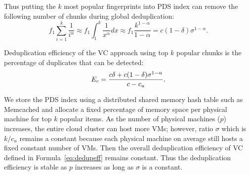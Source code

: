 Thus putting the $k$ most popular fingerprints into PDS index can remove the following number of chunks during global 
deduplication:
\[
f_1 \sum_{i=1}^{k}\frac{1}{i^\alpha} \approx  
f_1 \int_{1}^{k}\frac{1}{x^\alpha} dx  \approx  f_1\frac{  k^{1-\alpha}} {1-\alpha}
=c(1-\delta) \sigma^{1-\alpha}.
\]

Deduplication efficiency of the VC approach using top $k$ popular chunks
is the percentage of duplicates that can be detected:  
\begin{equation}
\label{eq:dedupeff}
E_c=\frac{ c\delta + c(1-\delta) \sigma^{1-\alpha}}
{c  - c_u }.\\
\end{equation}


We store the PDS index using a distributed shared memory hash table such as Memcached
and allocate a fixed percentage of memory space per physical machine for top $k$ popular items.
As the number of physical machines ($p$) increases,
the entire cloud cluster can host more VMs; however,  ratio $\sigma$ which is $k/c_u$ remains
a constant because each physical machine on average still hosts a fixed constant number of 
VMs. Then the overall deduplication efficiency of VC defined in Formula~\ref{eq:dedupeff}
remains constant.
Thus the deduplication efficiency is stable  as $p$ increases as long as $\sigma$  is a constant.


